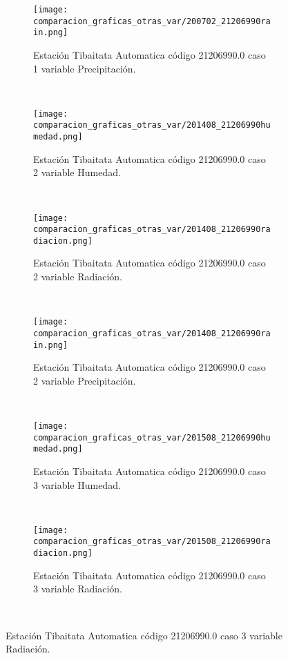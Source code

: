 \begin{figure}[H]
\centering
\begin{subfigure}[normla]{0.4\textwidth}
\caption{Estación Tibaitata Automatica código 21206990.0 caso 1 variable Precipitación.}
\texttt{[image: comparacion\_graficas\_otras\_var/200702\_21206990rain.png]}
\end{subfigure}
~
\begin{subfigure}[normla]{0.4\textwidth}
\caption{Estación Tibaitata Automatica código 21206990.0 caso 2 variable Humedad.}
\texttt{[image: comparacion\_graficas\_otras\_var/201408\_21206990humedad.png]}
\end{subfigure}
~
\begin{subfigure}[normla]{0.4\textwidth}
\caption{Estación Tibaitata Automatica código 21206990.0 caso 2 variable Radiación.}
\texttt{[image: comparacion\_graficas\_otras\_var/201408\_21206990radiacion.png]}
\end{subfigure}
~
\begin{subfigure}[normla]{0.4\textwidth}
\caption{Estación Tibaitata Automatica código 21206990.0 caso 2 variable Precipitación.}
\texttt{[image: comparacion\_graficas\_otras\_var/201408\_21206990rain.png]}
\end{subfigure}
~
\begin{subfigure}[normla]{0.4\textwidth}
\caption{Estación Tibaitata Automatica código 21206990.0 caso 3 variable Humedad.}
\texttt{[image: comparacion\_graficas\_otras\_var/201508\_21206990humedad.png]}
\end{subfigure}
~
\begin{subfigure}[normla]{0.4\textwidth}
\caption{Estación Tibaitata Automatica código 21206990.0 caso 3 variable Radiación.}
\texttt{[image: comparacion\_graficas\_otras\_var/201508\_21206990radiacion.png]}
\end{subfigure}
~
\end{figure}
           
